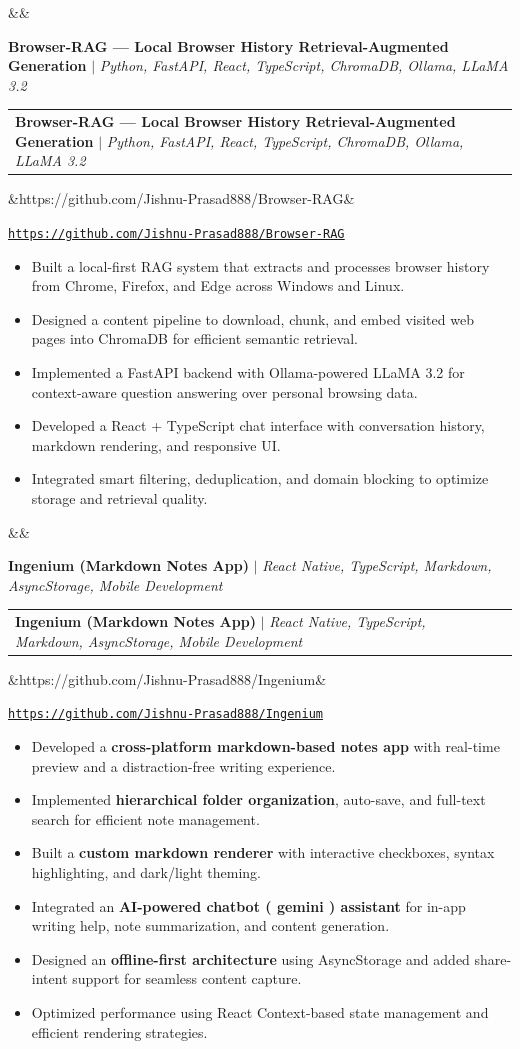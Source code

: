 \documentclass[letterpaper,11pt]{article}
\makeatletter
\newcommand{\resumeItem}[1]{
  \item\small{
    {#1 \vspace{-2pt}}
  }
}
\newcommand{\resumeProjectHeading}[3]{
    \item
    \ifx&#2&
      {\small #1\par}
    \else
      \begin{tabular*}{0.97\textwidth}{l@{\extracolsep{\fill}}r}
        \small#1 & #2 \\
      \end{tabular*}
    \fi
    \ifx&#3&\else
      \vspace{-4pt}
      {\small \printlink{#3}\par}
    \fi
    \vspace{-7pt}
}
\newcommand{\resumeItemListStart}{\begin{itemize}}
\newcommand{\resumeItemListEnd}{\end{itemize}\vspace{-5pt}}
\newcommand{\printlink}[1]{\href{#1}{\underline{\texttt{\small #1}}}}
\makeatother
\begin{document}
      \resumeProjectHeading
          {\textbf{Browser-RAG --- Local Browser History Retrieval-Augmented Generation} $|$ \emph{Python, FastAPI, React, TypeScript, ChromaDB, Ollama, LLaMA 3.2}}
          {}
          {https://github.com/Jishnu-Prasad888/Browser-RAG}
          \resumeItemListStart
            \resumeItem{Built a local-first RAG system that extracts and processes browser history from Chrome, Firefox, and Edge across Windows and Linux.}
            \resumeItem{Designed a content pipeline to download, chunk, and embed visited web pages into ChromaDB for efficient semantic retrieval.}
            \resumeItem{Implemented a FastAPI backend with Ollama-powered LLaMA 3.2 for context-aware question answering over personal browsing data.}
            \resumeItem{Developed a React + TypeScript chat interface with conversation history, markdown rendering, and responsive UI.}
            \resumeItem{Integrated smart filtering, deduplication, and domain blocking to optimize storage and retrieval quality.}
          \resumeItemListEnd
\resumeProjectHeading
  {\textbf{Ingenium (Markdown Notes App)} $|$ \emph{React Native, TypeScript, Markdown, AsyncStorage, Mobile Development}}
  {}
  {https://github.com/Jishnu-Prasad888/Ingenium}
  \resumeItemListStart
    \resumeItem{Developed a \textbf{cross-platform markdown-based notes app} with real-time preview and a distraction-free writing experience.}
    \resumeItem{Implemented \textbf{hierarchical folder organization}, auto-save, and full-text search for efficient note management.}
    \resumeItem{Built a \textbf{custom markdown renderer} with interactive checkboxes, syntax highlighting, and dark/light theming.}
    \resumeItem{Integrated an \textbf{AI-powered chatbot ( gemini ) assistant} for in-app writing help, note summarization, and content generation.}
    \resumeItem{Designed an \textbf{offline-first architecture} using AsyncStorage and added share-intent support for seamless content capture.}
    \resumeItem{Optimized performance using React Context-based state management and efficient rendering strategies.}
  \resumeItemListEnd
          
\end{document}
